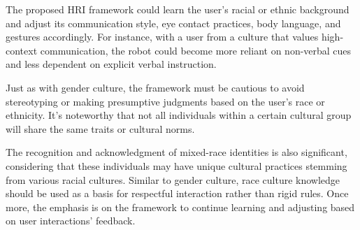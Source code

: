 The proposed HRI framework could learn the user's racial or ethnic background and adjust its communication style, eye contact practices, body language, and gestures accordingly. For instance, with a user from a culture that values high-context communication, the robot could become more reliant on non-verbal cues and less dependent on explicit verbal instruction.

Just as with gender culture, the framework must be cautious to avoid stereotyping or making presumptive judgments based on the user's race or ethnicity. It's noteworthy that not all individuals within a certain cultural group will share the same traits or cultural norms.

The recognition and acknowledgment of mixed-race identities is also significant, considering that these individuals may have unique cultural practices stemming from various racial cultures. Similar to gender culture, race culture knowledge should be used as a basis for respectful interaction rather than rigid rules. Once more, the emphasis is on the framework to continue learning and adjusting based on user interactions' feedback.